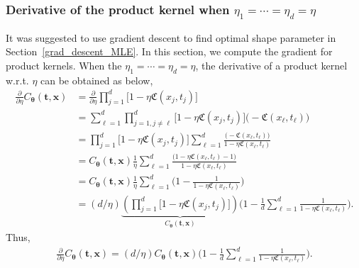 \documentclass{svjour3}                     %
\newcommand{\bm}[1]{\boldsymbol{#1}}
\newcommand{\vtheta}{{\bm{\theta}}}
\newcommand{\vt}{\bm{t}}
\newcommand{\vx}{\bm{x}}
\newcommand\secref{Section~\ref}
\begin{document}
\subsubsection{Derivative of the product kernel when $\eta_1=\cdots=\eta_d=\eta$}
\label{sec:deriv_of_kernel}
It was suggested to use gradient descent to find optimal shape parameter in \secref{grad_descent_MLE}. In this section, we compute the gradient for product kernels. When the $\eta_1=\cdots=\eta_d=\eta$, the derivative of a product kernel  w.r.t. $\eta$ can be obtained as below,
\begin{align*}
\frac{\partial}{\partial \eta} C_\vtheta(\vt, \vx) 
& =
\frac{\partial}{\partial \eta} 
\prod_{j=1}^d \biggl[
1 - \eta \mathfrak{C}(x_j,t_j) \biggr] %
\\
& = 
\sum_{\ell=1}^d  
\prod_{j=1, j \neq \ell}^d \biggl[
1 - \eta \mathfrak{C}(x_j,t_j) \biggr]
\biggl( - \mathfrak{C}(x_\ell,t_\ell) \biggr)
\\
& =
\prod_{j=1}^d \biggl[
1 - \eta \mathfrak{C}(x_j,t_j) \biggr]
\sum_{\ell=1}^d 
\frac{
	\biggl( - \mathfrak{C}(x_\ell,t_\ell) \biggr)
}{
	1 - \eta \mathfrak{C}(x_\ell,t_\ell) 
}
\\
& =
C_\vtheta(\vt, \vx) 
\frac{1}{\eta}
\sum_{\ell=1}^d 
\frac{
	\biggl(1 - \eta \mathfrak{C}({x_\ell,t_\ell})  - 1 \biggr)
}{
	1 - \eta \mathfrak{C}(x_\ell,t_\ell) 
}
\\
& =
C_\vtheta(\vt, \vx) 
\frac{1}{\eta}
\sum_{\ell=1}^d 
\biggl(
1 - 
\frac{1
}{
	1 - \eta \mathfrak{C}(x_\ell,t_\ell) 
}
\biggr)
\\
& =
({d}/{\eta} )
\underbrace{
	\left(
	\prod_{j=1}^d \biggl[
	1 - \eta \mathfrak{C}(x_j,t_j) \biggr]
	\right) }_
{ C_\vtheta(\vt, \vx) }
\biggl(
1 - 
\frac{1}{d} \sum_{\ell=1}^d
\frac{1}
{ 1 - \eta \mathfrak{C}(x_\ell,t_\ell) }
\biggr)
.
\end{align*}
Thus,
\begin{align*}
\frac{\partial}{\partial \eta} C_\vtheta(\vt, \vx) = ({d}/{\eta} ) C_\vtheta(\vt, \vx) 
\biggl(
1 - 
\frac{1}{d} \sum_{\ell=1}^d
\frac{1}
{ 1 - \eta \mathfrak{C}(x_\ell,t_\ell) }
\biggr).
\end{align*}
\end{document}
